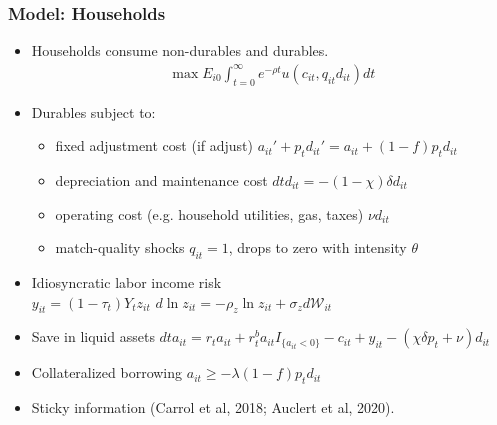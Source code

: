 \documentclass[english,xcolor=svgnames]{beamer}
\begin{document}
\begin{frame}
\frametitle{Model: Households}
\begin{itemize}
\item Households consume non-durables and durables.
	\begin{align*}
		\max  E_{i0}\int_{t=0}^{\infty}e^{-\rho t}   u\left( c_{it}, q_{it} d_{it} \right)  d t 
	\end{align*}
\item Durables subject to:
	\begin{itemize}
	\item fixed adjustment cost (if adjust) $a_{it}'+p_t d_{it}' = a_{it}+(1-f)p_t d_{it}$
	\item depreciation and maintenance cost $dt d_{it} = -(1-\chi)\delta d_{it} $
	\item operating cost (e.g. household utilities, gas, taxes) $\nu  d_{it}$
	\item match-quality shocks $q_{it} =1$, drops to zero with intensity $\theta$
	\end{itemize}
\item Idiosyncratic labor income risk\\ $y_{it} = \left(1-\tau_t\right) Y_t z_{it}$\hspace{2cm}
$d \ln z_{it} = -\rho_z \ln z_{it} + \sigma_z d \mathcal W_{it} $
\item Save in liquid assets
         $dt a_{it} = r_t a_{it} + r_t^b a_{it}I_{\{a_{it}<0\}} - c_{it} +  y_{it}-(\chi\delta p_t + \nu)  d_{it}$ 
\item Collateralized borrowing $a_{it} \ge -\lambda(1-f)p_{t} d_{it}$
\item Sticky information (Carrol et al, 2018; Auclert et al, 2020).
\end{itemize}
\end{frame}
\end{document}
